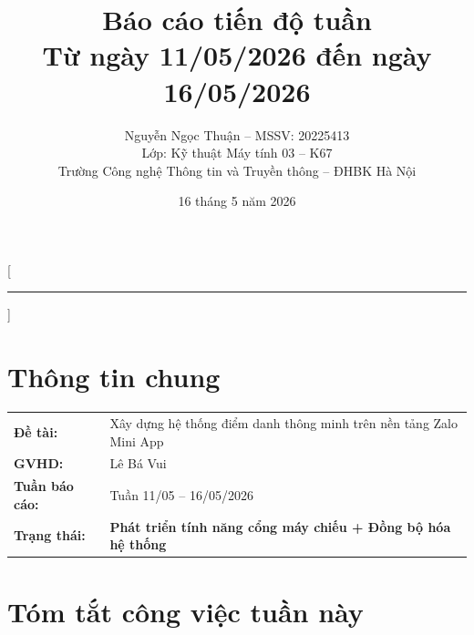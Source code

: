 \documentclass{article}
\title{Báo cáo tiến độ tuần\\[0.3em] \large Từ ngày 11/05/2026 đến ngày 16/05/2026}
\author{Nguyễn Ngọc Thuận -- MSSV: 20225413\\[0.2em] \normalsize Lớp: Kỹ thuật Máy tính 03 -- K67\\[0.1em] \normalsize Trường Công nghệ Thông tin và Truyền thông -- ĐHBK Hà Nội}
\date{16 tháng 5 năm 2026}
\begin{document}
\maketitle



\pagestyle{fancy}
\fancyhf{}
\fancyfoot[C]{\small\thepage}
\renewcommand{\headrulewidth}{0.4pt}

[\vspace{-0.3em}\textcolor{hustred}{\rule{\textwidth}{0.8pt}}]

\section{Thông tin chung}

\begin{tabularx}{\textwidth}{@{}l X@{}}
\textbf{Đề tài:} & Xây dựng hệ thống điểm danh thông minh trên nền tảng Zalo Mini App \\
\textbf{GVHD:} & Lê Bá Vui \\
\textbf{Tuần báo cáo:} & Tuần 11/05 -- 16/05/2026 \\
\textbf{Trạng thái:} & \textcolor{statusgreen}{\textbf{Phát triển tính năng cổng máy chiếu + Đồng bộ hóa hệ thống}} \\
\end{tabularx}

\section{Tóm tắt công việc tuần này}
\end{document}
